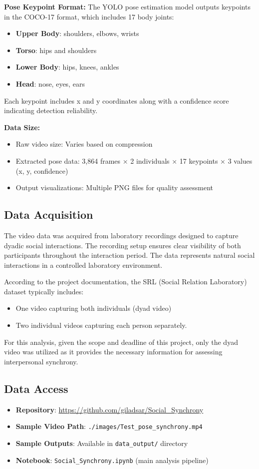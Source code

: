 \documentclass[11pt]{article}
\begin{document}
\textbf{Pose Keypoint Format:}
The YOLO pose estimation model outputs keypoints in the COCO-17 format, which includes 17 body joints:
\begin{itemize}
    \item \textbf{Upper Body}: shoulders, elbows, wrists
    \item \textbf{Torso}: hips and shoulders
    \item \textbf{Lower Body}: hips, knees, ankles
    \item \textbf{Head}: nose, eyes, ears
\end{itemize}

Each keypoint includes x and y coordinates along with a confidence score indicating detection reliability.

\textbf{Data Size:}
\begin{itemize}
    \item Raw video size: Varies based on compression
    \item Extracted pose data: 3,864 frames × 2 individuals × 17 keypoints × 3 values (x, y, confidence)
    \item Output visualizations: Multiple PNG files for quality assessment
\end{itemize}

\subsection{Data Acquisition}
The video data was acquired from laboratory recordings designed to capture dyadic social interactions. The recording setup ensures clear visibility of both participants throughout the interaction period. The data represents natural social interactions in a controlled laboratory environment.

According to the project documentation, the SRL (Social Relation Laboratory) dataset typically includes:
\begin{itemize}
    \item One video capturing both individuals (dyad video)
    \item Two individual videos capturing each person separately.
\end{itemize}

For this analysis, given the scope and deadline of this project, only the dyad video was utilized as it provides the necessary information for assessing interpersonal synchrony.

\subsection{Data Access}
\begin{itemize}
    \item \textbf{Repository}: \url{https://github.com/giladsar/Social_Synchrony}
    \item \textbf{Sample Video Path}: \texttt{./images/Test\_pose\_synchrony.mp4}
    \item \textbf{Sample Outputs}: Available in \texttt{data\_output/} directory
    \item \textbf{Notebook}: \texttt{Social\_Synchrony.ipynb} (main analysis pipeline)
\end{itemize}
\end{document}
